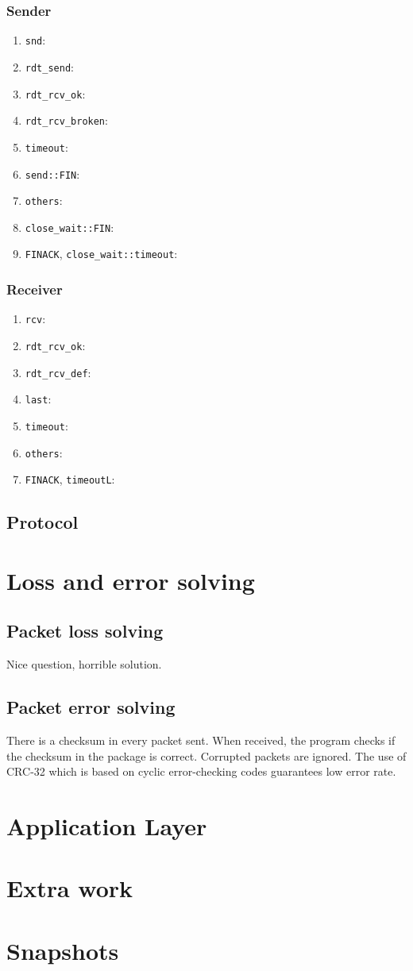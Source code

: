 \documentclass[10pt,a4paper]{article}
\begin{document}
    \subsubsection{Sender}
    \begin{enumerate}
    	\item \texttt{snd}:
        \item \texttt{rdt\_send}:
        \item \texttt{rdt\_rcv\_ok}:
        \item \texttt{rdt\_rcv\_broken}:
        \item \texttt{timeout}:
        \item \texttt{send::FIN}:
        \item \texttt{others}:
        \item \texttt{close\_wait::FIN}:
        \item \texttt{FINACK}, \texttt{close\_wait::timeout}:
    \end{enumerate}
    \subsubsection{Receiver}
    \begin{enumerate}
        \item \texttt{rcv}:
        \item \texttt{rdt\_rcv\_ok}:
        \item \texttt{rdt\_rcv\_def}:
        \item \texttt{last}:
        \item \texttt{timeout}:
        \item \texttt{others}:
        \item \texttt{FINACK}, \texttt{timeoutL}:
    \end{enumerate}
\subsection{Protocol}
\section{Loss and error solving}
    \subsection{Packet loss solving}
        Nice question, horrible solution.
    \subsection{Packet error solving}
        There is a checksum in every packet sent. When received, the program checks if the checksum in the package is correct. Corrupted packets are ignored. The use of CRC-32 which is based on cyclic error-checking codes guarantees low error rate.

\section{Application Layer}
\section{Extra work}
\section{Snapshots}
\end{document}
